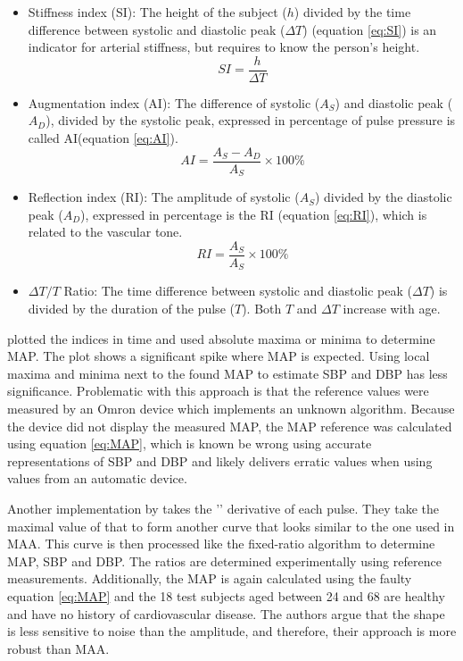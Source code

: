 \begin{itemize}

\item Stiffness index (SI): The height of the subject ($h$) divided by the time difference between systolic and diastolic peak ($\Delta T$) (equation \ref{eq:SI}) is an indicator for arterial stiffness, but requires to know the person's height.
\begin{equation}
\label{eq:SI}
SI=\frac{h}{\Delta T}
\end{equation}

\item Augmentation index (AI): The difference of systolic ($A_S$) and diastolic peak ($A_D$), divided by the systolic peak, expressed in percentage of pulse pressure is called AI(equation \ref{eq:AI}).
\begin{equation}
\label{eq:AI}
AI=\frac{A_S-A_D}{A_S}\times100\%
\end{equation}


\item Reflection index (RI): The amplitude	 of systolic ($A_S$) divided by the diastolic peak ($A_D$), expressed in percentage is the RI (equation \ref{eq:RI}), which is related to the vascular tone.
\begin{equation}
\label{eq:RI}
RI=\frac{A_S}{A_S}\times100\%
\end{equation}



\item $\Delta T/T$ Ratio: The time difference between systolic and diastolic peak ($\Delta T$) is divided by the duration of the pulse ($T$). Both $T$ and $\Delta T$ increase with age.

\end{itemize}

\citet{Mafi2011} plotted the indices in time and used absolute maxima or minima to determine MAP. The plot shows a significant spike where MAP is expected. Using local maxima and minima next to the found MAP to estimate SBP and DBP has less significance. Problematic with this approach is that the reference values were measured by an Omron device which implements an unknown algorithm. Because the device did not display the measured MAP, the MAP reference was calculated using equation \ref{eq:MAP}, which is known be wrong using accurate representations of SBP and DBP and likely delivers erratic values when using values from an automatic device.

Another implementation by \citet{Mafi2012} takes the '' derivative of each pulse. They take the maximal value of that to form another curve that looks similar to the one used in MAA. This curve is then processed like the fixed-ratio algorithm to determine MAP, SBP and DBP. The ratios are determined experimentally using reference measurements. Additionally, the MAP is again calculated using the faulty equation \ref{eq:MAP} and the 18 test subjects aged between 24 and 68 are healthy and have no history of cardiovascular disease. The authors argue that the shape is less sensitive to noise than the amplitude, and therefore, their approach is more robust than MAA.


